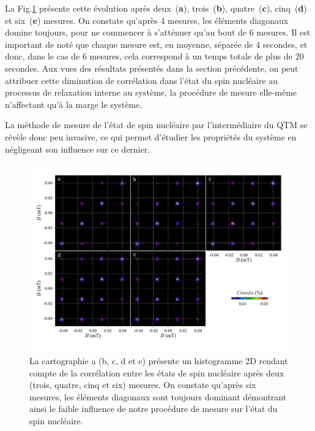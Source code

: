 La Fig.\ref{evolution_mesures} présente cette évolution après deux~(\textbf{a}), trois~(\textbf{b}), quatre~(\textbf{c}), cinq~(\textbf{d}) et six~(\textbf{e}) mesures. On constate qu'après 4 mesures, les éléments diagonaux domine toujours, pour ne commencer à s'atténuer qu'au bout de 6 mesures. Il est important de noté que chaque mesure est, en moyenne, séparée de 4 secondes, et donc, dans le cas de 6 mesures, cela correspond à un temps totale de plus de 20 secondes. Aux vues des résultats présentés dans la section précédente, on peut attribuer cette diminution de corrélation dans l'état du spin nucléaire au processus de relaxation interne au système, la procédure de mesure elle-même n'affectant qu'à la marge le système. 

La méthode de mesure de l'état de spin nucléaire par l'intermédiaire du QTM se révèle donc peu invasive, ce qui permet d'étudier les propriétés du système en négligeant son influence sur ce dernier.

\begin{figure}
\includegraphics[scale=0.45]{Resultats/MesureInfl/MesureInfl.pdf} 
\caption{La cartographie a (b, c, d et e) présente un histogramme 2D rendant compte de la corrélation entre les états de spin nucléaire après deux (trois, quatre, cinq et six) mesures. On constate qu'après six mesures, les éléments diagonaux sont toujours dominant démontrant ainsi le faible influence de notre procédure de mesure sur l'état du spin nucléaire.}
\label{evolution_mesures}
\end{figure}

